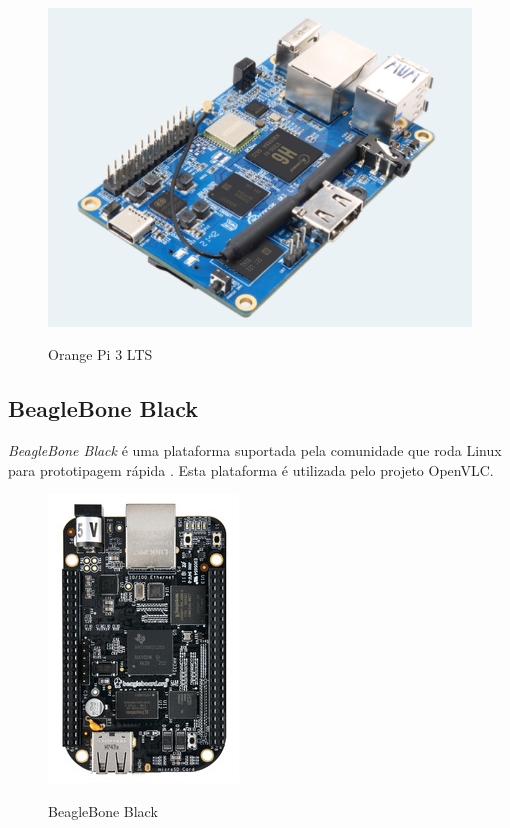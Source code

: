\begin{figure}[!htbp]
  \caption{Orange Pi 3 LTS}
  \includegraphics[scale=0.3]{images/orange.png}
  \label{figura:orange}
\end{figure}

\subsection{BeagleBone Black}

\textit{BeagleBone Black} é uma plataforma suportada pela comunidade que roda Linux para prototipagem rápida \cite{beaglebone}.
Esta plataforma é utilizada pelo projeto OpenVLC.

\begin{figure}[!htbp]
  \caption{BeagleBone Black}
  \includegraphics[scale=0.6]{images/beaglebone.png}
  \label{figura:beagle}
\end{figure}

